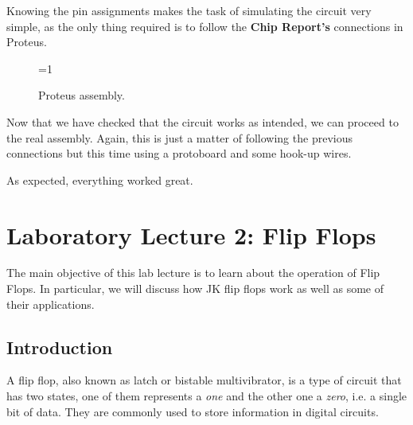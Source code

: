 \documentclass[a4paper, 11pt, oneside]{article}
\begin{document}
Knowing the pin assignments makes the task of simulating the circuit very simple, as the only thing required is to follow the \textbf{Chip Report's} connections in Proteus.

\begin{figure}[H]
    \centering
    
    \ifnum\value{ANIMATION}=1 {
    } 
    \fi
    
    \caption{Proteus assembly.}
    \label{fig:PROTEUS_TEMP}
\end{figure}

Now that we have checked that the circuit works as intended, we can proceed to the real assembly. Again, this is just a matter of following the previous connections but this time using a protoboard and some hook-up wires. \medskip

As expected, everything worked great.

\newpage

\section{Laboratory Lecture 2: Flip Flops}

The main objective of this lab lecture is to learn about the operation of Flip Flops. In particular, we will discuss how JK flip flops work as well as some of their applications.

\subsection{Introduction}

A flip flop, also known as latch or bistable multivibrator, is a type of circuit that has two states, one of them represents a \textit{one} and the other one a \textit{zero}, i.e. a single bit of data. They are commonly used to store information in digital circuits.\medskip 
\end{document}
